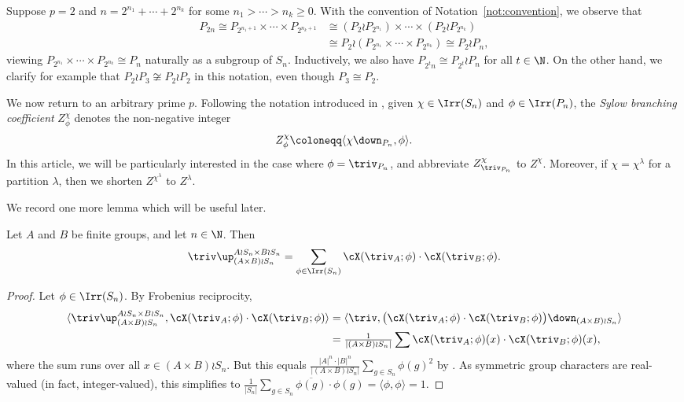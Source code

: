 \begin{remark}\label{rem:convention}
	Suppose $p=2$ and $n=2^{n_1}+\cdots+2^{n_k}$ for some $n_1>\cdots>n_k\ge 0$. With the convention of Notation~\ref{not:convention}, we observe that 
	\begin{align*}
		P_{2n} \cong P_{2^{n_1+1}}\times\cdots\times P_{2^{n_k+1}} &\cong (P_2\wr P_{2^{n_1}})\times\cdots\times (P_2\wr P_{2^{n_k}})\\
		&\cong P_2 \wr (P_{2^{n_1}}\times \cdots \times P_{2^{n_k}})\cong P_2 \wr P_n,
	\end{align*}
	viewing $P_{2^{n_1}}\times \cdots \times P_{2^{n_k}}\cong P_n$ naturally as a subgroup of $S_n$. Inductively, we also have $P_{2^tn}\cong P_{2^t}\wr P_n$ for all $t\in\N$.
	On the other hand, we clarify for example that $P_2\wr P_3 \not\cong P_2\wr P_2$ in this notation, even though $P_3\cong P_2$.%
\end{remark}

We now return to an arbitrary prime $p$. Following the notation introduced in \cite{GL2}, given $\chi\in\Irr(S_n)$ and $\phi\in\Irr(P_n)$, the \textit{Sylow branching coefficient} $Z^\chi_\phi$ denotes the non-negative integer
\[ Z^\chi_\phi\coloneqq \langle \chi\down_{P_n}, \phi\rangle. \]
In this article, we will be particularly interested in the case where $\phi=\triv_{P_n}$, and abbreviate $Z^\chi_{\triv_{P_n}}$ to $Z^\chi$. Moreover, if $\chi=\chi^\lambda$ for a partition $\lambda$, then we shorten $Z^{\chi^\lambda}$ to $Z^\lambda$. 

We record one more lemma which will be useful later.
\begin{lemma}\label{lem:X-induced}
	Let $A$ and $B$ be finite groups, and let $n\in\N$. Then
	\[ \triv\up_{(A\times B)\wr S_n}^{A\wr S_n \times B\wr S_n} = \sum_{\phi\in\Irr(S_n)} \cX(\triv_A;\phi)\cdot\cX(\triv_B;\phi). \]
\end{lemma}
\begin{proof}
	Let $\phi\in\Irr(S_n)$. By Frobenius reciprocity, 
	\begin{align*}
		\langle \triv\up_{(A\times B)\wr S_n}^{A\wr S_n \times B\wr S_n}, \cX(\triv_A;\phi)\cdot\cX(\triv_B;\phi)\rangle &= \langle \triv, \big( \cX(\triv_A;\phi)\cdot\cX(\triv_B;\phi) \big) \down_{(A\times B)\wr S_n}\rangle\\
		&= \tfrac{1}{|(A\times B)\wr S_n|}\sum \cX(\triv_A;\phi)(x)\cdot\cX(\triv_B;\phi)(x),
	\end{align*}
where the sum runs over all $x\in (A\times B)\wr S_n$.
	But this equals $\tfrac{|A|^n\cdot|B|^n}{|(A\times B)\wr S_n|}\sum_{g\in S_n} \phi(g)^2$ by \cite[Lemma 4.3.9]{JK}. As symmetric group characters are real-valued (in fact, integer-valued), this simplifies to $\tfrac{1}{|S_n|}\sum_{g\in S_n}\overline{\phi(g)}\cdot\phi(g)=\langle \phi,\phi\rangle=1$.
\end{proof}



